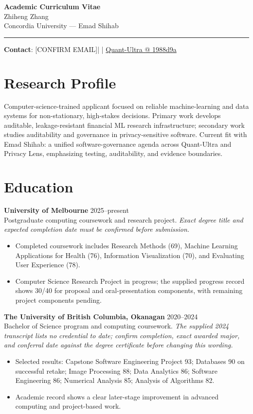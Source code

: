 \documentclass[11pt]{article}
\makeatletter
\newcommand{\ApplicantName}{Zhiheng Zhang}
\newcommand{\ApplicantEmail}{[CONFIRM EMAIL]}
\newcommand{\ApplicantPhone}{[CONFIRM PHONE]}
\newcommand{\ApplicantGitHub}{\href{https://github.com/zhiheng-zhang-Mera/Quant-Ultra/tree/1988d9a8530da91a8158de864d098ea869098923}{Quant-Ultra @ 1988d9a}}
\makeatother
\begin{document}
\begin{center}
{\LARGE\bfseries Academic Curriculum Vitae}\\[0.25em]
{\large \ApplicantName}\\
Concordia University --- Emad Shihab
\end{center}
\vspace{0.35em}\hrule\vspace{0.65em}

\textbf{Contact}: \ApplicantEmail\quad | \quad \ApplicantPhone\quad | \quad \ApplicantGitHub

\section*{Research Profile}
Computer-science-trained applicant focused on reliable machine-learning and data systems for non-stationary, high-stakes decisions. Primary work develops auditable, leakage-resistant financial ML research infrastructure; secondary work studies auditability and governance in privacy-sensitive software. Current fit with Emad Shihab: a unified software-governance agenda across Quant-Ultra and Privacy Lens, emphasizing testing, auditability, and evidence boundaries.

\section*{Education}
\textbf{University of Melbourne} \hfill 2025--present\\
Postgraduate computing coursework and research project. \textit{Exact degree title and expected completion date must be confirmed before submission.}
\begin{itemize}
\item Completed coursework includes Research Methods (69), Machine Learning Applications for Health (76), Information Visualization (70), and Evaluating User Experience (78).
\item Computer Science Research Project in progress; the supplied progress record shows 30/40 for proposal and oral-presentation components, with remaining project components pending.
\end{itemize}

\textbf{The University of British Columbia, Okanagan} \hfill 2020--2024\\
Bachelor of Science program and computing coursework. \textit{The supplied 2024 transcript lists no credential to date; confirm completion, exact awarded major, and conferral date against the degree certificate before changing this wording.}
\begin{itemize}
\item Selected results: Capstone Software Engineering Project 93; Databases 90 on successful retake; Image Processing 88; Data Analytics 86; Software Engineering 86; Numerical Analysis 85; Analysis of Algorithms 82.
\item Academic record shows a clear later-stage improvement in advanced computing and project-based work.
\end{itemize}
\end{document}
